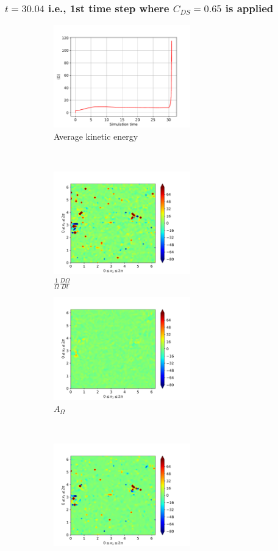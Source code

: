 \subsubsection{$t=30.04$ i.e., 1st time step where $C_{DS}=0.65$ is applied} 
\begin{figure}[H]
    \begin{subfigure}[H]{0.45\textwidth}
        \includegraphics[height=1.75in]{media/run-cds-65/enst-average1460}
        \caption{Average kinetic energy}
    \end{subfigure}
    ~
    \begin{subfigure}[H]{0.45\textwidth}
        \includegraphics[height=1.75in]{media/run-cds-65/enst-1460}
        \caption{$\frac{1}{\Omega} \frac{D \Omega}{Dt}$}
    \end{subfigure}
    \newline
    \begin{subfigure}{0.45\textwidth}
        \includegraphics[height=1.75in]{media/run-cds-65/A-enst-1460}
        \caption{$A_{\Omega}$}
    \end{subfigure}
    ~
    \begin{subfigure}{0.45\textwidth}
        \includegraphics[height=1.75in]{media/run-cds-65/Pi-enst-1460}

\end{subfigure}
\end{figure}
